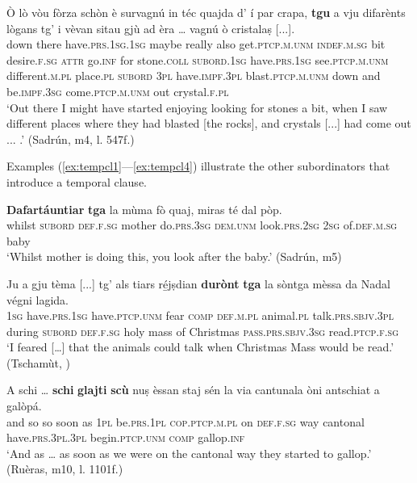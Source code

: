 \ea
\label{ex:tempcltgu3}
\gll  Ò lò vòu fòrza schòn è survagnú in téc quajda d' í par crapa, \textbf{tgu} a vju difarènts lògans tg’ i vèvan sitau gjù ad èra … vagnú ò cristalaṣ [...]. \\
down there  have.\textsc{prs.1sg.1sg} maybe really also get.\textsc{ptcp.m.unm} \textsc{indef.m.sg} bit desire.\textsc{f.sg} \textsc{attr} go.\textsc{inf} for stone.\textsc{coll} \textsc{subord.1sg} have.\textsc{prs.1sg} see.\textsc{ptcp.m.unm} different.\textsc{m.pl} place.\textsc{pl} \textsc{subord} \textsc{3pl} have.\textsc{impf.3pl} blast.\textsc{ptcp.m.unm} down and  be.\textsc{impf.3sg} {} come.\textsc{ptcp.m.unm} out crystal.\textsc{f.pl}\\
\glt `Out there I might have started enjoying looking for stones a bit, when I saw different places where they had blasted [the rocks], and crystals [...] had come out ... .' (Sadrún, m4, l. 547f.)
\z

Examples (\ref{ex:tempcl1}—\ref{ex:tempcl4}) illustrate the other subordinators that introduce a temporal clause.

\ea
\label{ex:tempcl1}
\gll \textbf{Dafartáuntiar} \textbf{tga} la mùma fò quaj, miras té dal pòp.\\
whilst \textsc{subord} \textsc{def.f.sg} mother do.\textsc{prs.3sg} \textsc{dem.unm} look.\textsc{prs.2sg} \textsc{2sg} of.\textsc{def.m.sg} baby\\
\glt `Whilst mother is doing this, you look after the baby.' (Sadrún, m5)
\z

\ea
\label{ex:tempcl2}
\gll Ju a gju tèma [...] tg' als tiars ré̱jṣdian \textbf{durònt} \textbf{tga} la sòntga mèssa da Nadal végni lagida.\\
      \textsc{1sg} have.\textsc{prs.1sg} have.\textsc{ptcp.unm} fear {} \textsc{comp} \textsc{def.m.pl} animal.\textsc{pl} talk.\textsc{prs.sbjv.3pl} during \textsc{subord} \textsc{def.f.sg} holy mass of Christmas \textsc{pass.prs.sbjv.3sg} read.\textsc{ptcp.f.sg}\\
\glt `I feared […] that the animals could talk when Christmas Mass would be read.' (Tschamùt, \citealt[19]{Büchli1966})
\z

\ea
\label{ex:tempcl3}
\gll  A schi … \textbf{schi} \textbf{glajti} \textbf{scù} nuṣ èssan staj sén la via cantunala òni antschiat a galòpá.  \\
and so {} so soon as \textsc{1pl} be.\textsc{prs.1pl} \textsc{cop.ptcp.m.pl} on \textsc{def.f.sg} way cantonal have.\textsc{prs.3pl.3pl} begin.\textsc{ptcp.unm} \textsc{comp} gallop.\textsc{inf}\\
\glt `And as … as soon as we were on the cantonal way they started to gallop.' (Ruèras, m10, l.  1101f.)
\z

